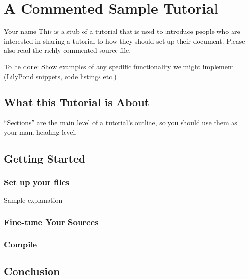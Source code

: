 \documentclass[../LilyPond-Tutorials]{subfiles}
\begin{document}
\chapter{A Commented Sample Tutorial}

\begin{authorAbstract}{Your name}
This is a stub of a tutorial that is used to introduce people who are interested in sharing a tutorial to how they should set up their document.
Please also read the richly commented source file.

To be done: Show examples of any spedific functionality we might implement (LilyPond snippets, code listings etc.)
\end{authorAbstract}

\section{What this Tutorial is About}
“Sections” are the main level of a tutorial's outline, so you should use them as your main heading level.

\section{Getting Started}
\subsection{Set up your files}
Sample explanation

\subsection{Fine-tune Your Sources}

\subsection{Compile}

\section{Conclusion}
\end{document}

